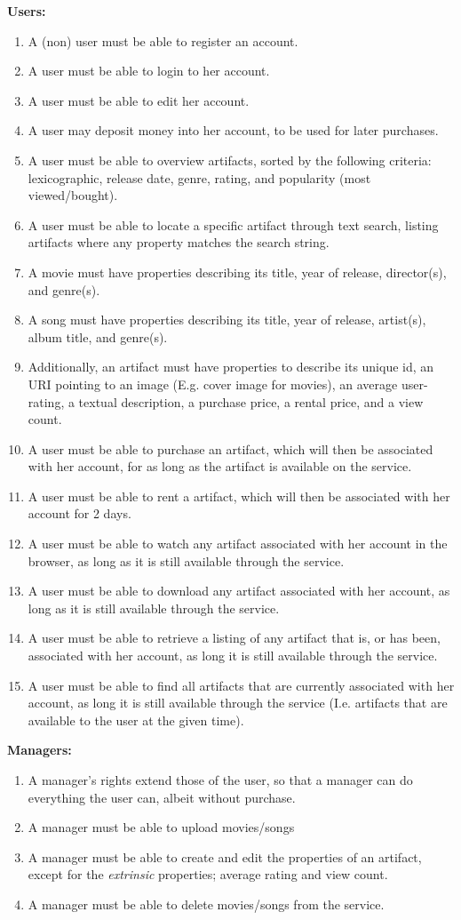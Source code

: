 \textbf{Users:}
\begin{enumerate}
\item A (non) user must be able to register an account.
\item A user must be able to login to her account.
\item A user must be able to edit her account.
\item A user may deposit money into her account, to be used for later
	purchases.
\item A user must be able to overview artifacts, sorted by the following
	criteria: lexicographic, release date, genre, rating, and
	popularity (most viewed/bought).
\item A user must be able to locate a specific artifact through text search,
	listing artifacts where any property matches the search string.
\item A movie must have properties describing its title, year of
	release, director(s), and genre(s).
\item A song must have properties describing its title, year of
	release, artist(s), album title, and genre(s).
\item Additionally, an artifact must have properties to describe its unique id,
	an URI pointing to an image (E.g. cover image for movies), an average
	user-rating, a textual description, a purchase price, a rental price,
	and a view count.
\item A user must be able to purchase an artifact, which will then be associated
	with her account, for as long as the artifact is available on the
	service.
\item A user must be able to rent a artifact, which will then be associated
	with her account for 2 days.
\item A user must be able to watch any artifact associated with her account
	in the browser, as long as it is still available through the service.
\item A user must be able to download any artifact associated with her account,
	as long as it is still available through the service.
\item A user must be able to retrieve a listing of any artifact that is, or has
	been, associated with her account, as long it is still available through
	the service.
\item A user must be able to find all artifacts that are currently associated
	with her account, as long it is still available through the service (I.e.
	artifacts that are available to the user at the given time).
\end{enumerate}
\textbf{Managers:}
\begin{enumerate}
\item A manager's rights extend those of the user, so that a manager can do
	everything the user can, albeit without purchase.
\item A manager must be able to upload movies/songs
\item A manager must be able to create and edit the properties of an artifact,
	except for the \emph{extrinsic} properties; average rating and view
	count.
\item A manager must be able to delete movies/songs from the service.
\end{enumerate}

